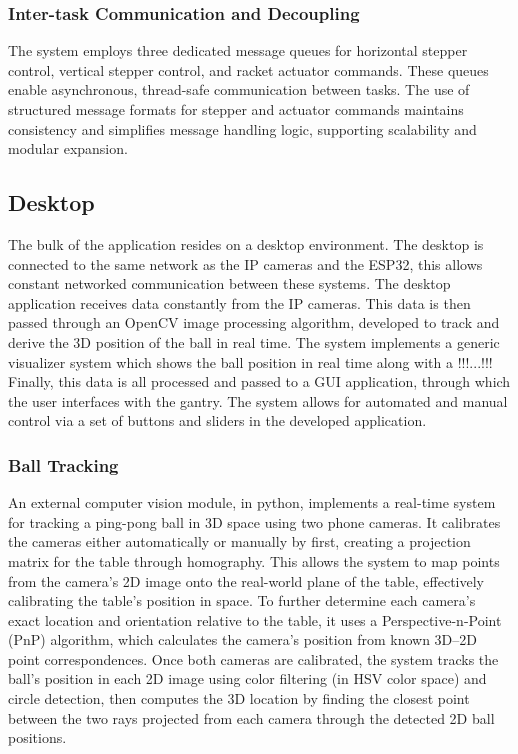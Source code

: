 \subsubsection{Inter-task Communication and Decoupling}
The system employs three dedicated message queues for horizontal stepper control, vertical stepper control, and racket actuator commands. These queues enable asynchronous, thread-safe communication between tasks. The use of structured message formats for stepper and actuator commands maintains consistency and simplifies message handling logic, supporting scalability and modular expansion.

\subsection{Desktop}
The bulk of the application resides on a desktop environment. The desktop is connected to the same network as the IP cameras and the ESP32, this allows constant networked communication between these systems. The desktop application receives data constantly from the IP cameras. This data is then passed through an OpenCV image processing algorithm, developed to track and derive the 3D position of the ball in real time. The system implements a generic visualizer system which shows the ball position in real time along with a !!!...!!! Finally, this data is all processed and passed to a GUI application, through which the user interfaces with the gantry. The system allows for automated and manual control via a set of buttons and sliders in the developed application.

\subsubsection{Ball Tracking}
An external computer vision module, in python, implements a real-time system for tracking a ping-pong ball in 3D space using two phone cameras. It calibrates the cameras either automatically or manually by first, creating a projection matrix for the table through homography. This allows the system to map points from the camera’s 2D image onto the real-world plane of the table, effectively calibrating the table’s position in space. To further determine each camera’s exact location and orientation relative to the table, it uses a Perspective-n-Point (PnP) algorithm, which calculates the camera's position from known 3D–2D point correspondences. Once both cameras are calibrated, the system tracks the ball’s position in each 2D image using color filtering (in HSV color space) and circle detection, then computes the 3D location by finding the closest point between the two rays projected from each camera through the detected 2D ball positions.

